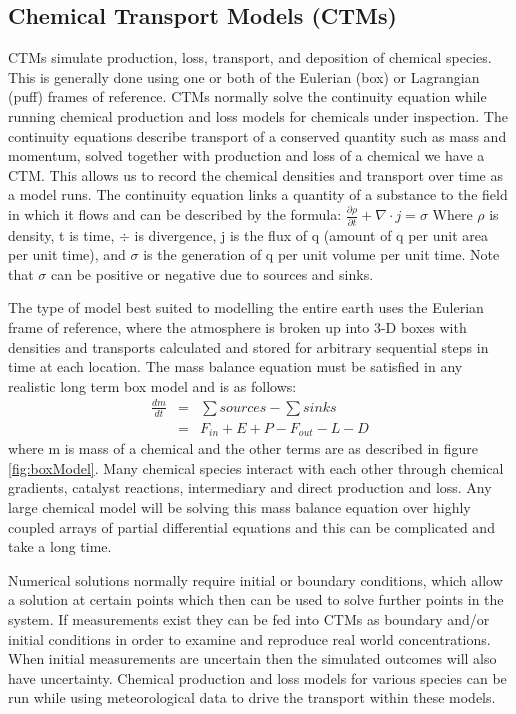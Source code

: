 \subsection{Chemical Transport Models (CTMs)}
CTMs simulate production, loss, transport, and deposition of chemical species.
This is generally done using one or both of the Eulerian (box) or Lagrangian (puff) frames of reference.
CTMs normally solve the continuity equation while running chemical production and loss models for chemicals under inspection. 
The continuity equations describe transport of a conserved quantity such as mass and momentum, solved together with production and loss of a chemical we have a CTM.
This allows us to record the chemical densities and transport over time as a model runs.
The continuity equation links a quantity of a substance to the field in which it flows and can be described by the formula:
$ \frac{\partial \rho}{\partial t} + \nabla \cdot j = \sigma $
Where $\rho$ is density, t is time, $\div$ is divergence, j is the flux of q (amount of q per unit area per unit time), and $\sigma$ is the generation of q per unit volume per unit time.
Note that $\sigma$ can be positive or negative due to sources and sinks.

The type of model best suited to modelling the entire earth uses the Eulerian frame of reference, where the atmosphere is broken up into 3-D boxes with densities and transports calculated and stored for arbitrary sequential steps in time at each location.
The mass balance equation must be satisfied in any realistic long term box model and is as follows: 
\begin{eqnarray*}
\frac{dm}{dt} &=& \sum{sources}-\sum{sinks} \\
    &=& F_{in} + E + P - F_{out} - L - D \end{eqnarray*}
where m is mass of a chemical and the other terms are as described in figure \ref{fig:boxModel}.
Many chemical species interact with each other through chemical gradients, catalyst reactions, intermediary and direct production and loss. 
Any large chemical model will be solving this mass balance equation over highly coupled arrays of partial differential equations and this can be complicated and take a long time.

Numerical solutions normally require initial or boundary conditions, which allow a solution at certain points which then can be used to solve further points in the system.
If measurements exist they can be fed into CTMs as boundary and/or initial conditions in order to examine and reproduce real world concentrations.
When initial measurements are uncertain then the simulated outcomes will also have uncertainty.
Chemical production and loss models for various species can be run while using meteorological data to drive the transport within these models.

